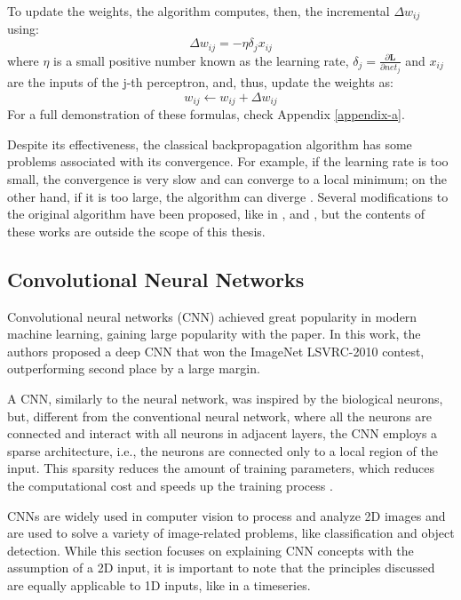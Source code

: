 To update the weights, the algorithm computes, then, the incremental $\Delta w_{ij}$ using:
\begin{equation}
    \Delta w_{ij} = -\eta \delta_j x_{ij}
\end{equation}
where $\eta$ is a small positive number known as the learning rate, $\delta_j = \frac{\partial \mathbf{L}}{\partial net_j}$ and $x_{ij}$ are the inputs of the j-th perceptron, and, thus, update the weights as:
\begin{equation}
    w_{ij} \xleftarrow{} w_{ij} + \Delta w_{ij}
\end{equation}
For a full demonstration of these formulas, check Appendix \ref{appendix-a}. 

Despite its effectiveness, the classical backpropagation algorithm has some problems associated with its convergence. For example, if the learning rate is too small, the convergence is very slow and can converge to a local minimum; on the other hand, if it is too large, the algorithm can diverge \cite{ruder2016overview}. Several modifications to the original algorithm have been proposed, like in \cite{QIAN1999145}, \cite{1370017282431050757} and \cite{kingma2017adammethodstochasticoptimization}, but the contents of these works are outside the scope of this thesis. 

\subsection{Convolutional Neural Networks} \label{section-CNN}
Convolutional neural networks (CNN) achieved great popularity in modern machine learning, gaining large popularity with the \cite{NIPS2012_c399862d} paper. In this work, the authors proposed a deep CNN that won the ImageNet LSVRC-2010 contest, outperforming second place by a large margin. 

A CNN, similarly to the neural network, was inspired by the biological neurons, but, different from the conventional neural network, where all the neurons are connected and interact with all neurons in adjacent layers, the CNN employs a sparse architecture, i.e., the neurons are connected only to a local region of the input. This sparsity reduces the amount of training parameters, which reduces the computational cost and speeds up the training process \cite{Alzubaidi_Zhang_Humaidi_Al_Dujaili_Duan_Al_Shamma_Santamaria_Fadhel_Al_Amidie_Farhan_2021, 9451544}. 

CNNs are widely used in computer vision to process and analyze 2D images and are used to solve a variety of image-related problems, like classification and object detection. While this section focuses on explaining CNN concepts with the assumption of a 2D input, it is important to note that the principles discussed are equally applicable to 1D inputs, like in a timeseries.

